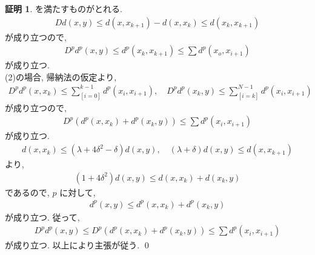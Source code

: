 \documentclass[10pt, fleqn, label-section=none]{bxjsarticle}
\theoremstyle{definition}
\newtheorem*{pf*}{証明}
\renewcommand{\;}{\, ; \,}
\begin{document}
\begin{pf*}
を満たすものがとれる. 
\begin{align*} D d(x, y) \leq  d(x, x_{k + 1}) - d(x, x_k) \leq d(x_k, x_{k + 1}) \end{align*}
が成り立つので, 
\begin{align*} D^p d^p(x, y) \leq  d^p(x_k, x_{k + 1}) \leq \sum d^p(x_o, x_{i + 1})  \end{align*}
が成り立つ. \\
(2)の場合, 帰納法の仮定より, 
\begin{align*} D^p d^p(x, x_k) \leq \sum_[i = 0]^{k-1} d^p(x_i, x_{i + 1})   , \quad D^p d^p(x_k, y) \leq \sum_[i = k]^{N-1} d^p(x_i, x_{i + 1}) \end{align*}
が成り立つので, 
\begin{align*} D^p (d^p(x, x_k) + d^p(x_k , y)) \leq \sum d^p (x_i, x_{i + 1}) \end{align*}
が成り立つ. 
\begin{align*} d(x, x_{k}) \leq (\lambda + 4 \delta ^2 - \delta) d(x, y), \quad (\lambda + \delta ) d(x, y) \leq d(x, x_{k+ 1})\end{align*}
より, 
\begin{align*} (1 + 4 \delta ^2 ) d(x, y) \leq d(x, x_k) + d(x_k ,y)  \end{align*}
であるので, $p$ に対して, 
\begin{align*}d^p(x, y) \leq d^p(x, x_k) + d^p (x_k, y) \end{align*}
が成り立つ. 従って, 
\begin{align*} D^p d^p(x, y) \leq D^p (d^p(x, x_k) + d^p(x_k , y)) \leq \sum d^p (x_i, x_{i + 1}) \end{align*}
が成り立つ. 以上により主張が従う. 
\qed
\end{pf*}
\end{document}

